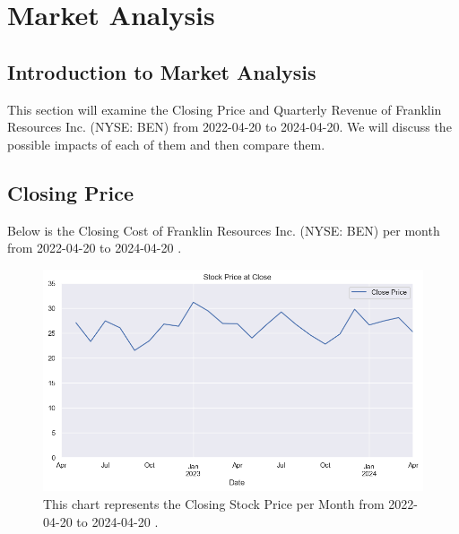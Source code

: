 \documentclass[9pt,a4paper,twoside]{tau}
\begin{document}
\section{Market Analysis}
    \subsection{Introduction to Market Analysis}
        
        This section will examine the Closing Price and Quarterly Revenue of Franklin Resources Inc. (NYSE: BEN) from 2022-04-20 to 2024-04-20. We will discuss the possible impacts of each of them and then compare them.
    
    \subsection{Closing Price}
        
        Below is the Closing Cost of Franklin Resources Inc. (NYSE: BEN) per month from 2022-04-20 to 2024-04-20 \cite{yahoo-finance-2024}.
            \begin{figure}[H]
                \centering
                \includegraphics[width=0.85\columnwidth]{Figures/CloseDataSet1mo.png}
                \caption{This chart represents the Closing Stock Price per Month from 2022-04-20 to 2024-04-20 \cite{yahoo-finance-2024}.}
                \label{fig:figure}
            \end{figure}
        
\end{document}
